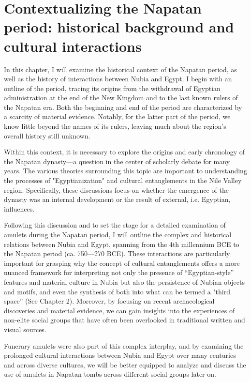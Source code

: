 \chapter{Contextualizing the Napatan period: historical background and cultural interactions}

In this chapter, I will examine the historical context of the Napatan period, as well as the history of interactions between Nubia and Egypt. I begin with an outline of the period, tracing its origins from the withdrawal of Egyptian administration at the end of the New Kingdom and to the last known rulers of the Napatan era. Both the beginning and end of the period are characterized by a scarcity of material evidence. Notably, for the latter part of the period, we know little beyond the names of its rulers, leaving much about the region's overall history still unknown.

Within this context, it is necessary to explore the origins and early chronology of the Napatan dynasty—a question in the center of scholarly debate for many years. The various theories surrounding this topic are important to understanding the processes of "Egyptianization" and cultural entanglements in the Nile Valley region. Specifically, these discussions focus on whether the emergence of the dynasty was an internal development or the result of external, i.e. Egyptian, influences.

Following this discussion and to set the stage for a detailed examination of amulets during the Napatan period, I will outline the complex and historical relations between Nubia and Egypt, spanning from the 4th millennium BCE to the Napatan period (ca. 750—270 BCE). These interactions are particularly important for grasping why the concept of cultural entanglements offers a more nuanced framework for interpreting not only the presence of “Egyptian-style” features and material culture in Nubia but also the persistence of Nubian objects and motifs, and even the synthesis of both into what can be termed a "third space” (See Chapter 2). Moreover, by focusing on recent archaeological discoveries and material evidence, we can gain insights into the experiences of non-elite social groups that have often been overlooked in traditional written and visual sources.

Funerary amulets were also part of this complex interplay, and by examining the prolonged cultural interactions between Nubia and Egypt over many centuries and across diverse cultures, we will be better equipped to analyze and discuss the use of amulets in Napatan tombs across different social groups later on.


